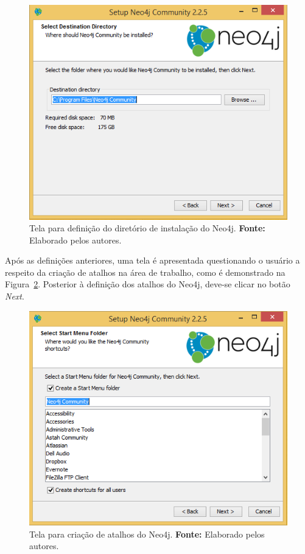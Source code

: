 \begin{figure}[h!]
	\centerline{\includegraphics[scale=0.4]{./imagens/neo4j-install-step3.png}}
	\caption[Tela para definição do diretório de instalação do Neo4j]
	{Tela para definição do diretório de instalação do Neo4j. \textbf{Fonte:} Elaborado pelos autores.}
	\label{fig:definicao_diretorio_neo4j}
\end{figure}

\par Após as definições anteriores, uma tela é apresentada questionando o usuário a respeito da criação de atalhos na área de trabalho, como é demonstrado na Figura~\ref{fig:criacao_atalho_neo4j}. Posterior à definição dos atalhos do Neo4j, deve-se clicar no botão \textit{Next}.

\begin{figure}[h!]
	\centerline{\includegraphics[scale=0.4]{./imagens/neo4j-install-step4.png}}
	\caption[Tela para criação de atalhos do Neo4j]
	{Tela para criação de atalhos do Neo4j. \textbf{Fonte:} Elaborado pelos autores.}
	\label{fig:criacao_atalho_neo4j}
\end{figure}

